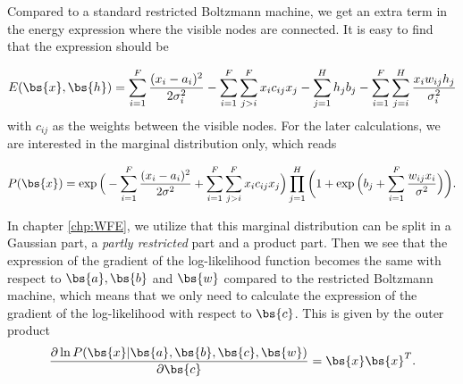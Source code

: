 Compared to a standard restricted Boltzmann machine, we get an extra term in the energy expression where the visible nodes are connected. It is easy to find that the expression should be

\begin{equation}
E(\bs{x},\bs{h})= \sum_{i=1}^F\frac{(x_i-a_i)^2}{2\sigma_i^2} - \sum_{i=1}^F\sum_{j>i}^Fx_ic_{ij}x_j- \sum_{j=1}^Hh_jb_j-\sum_{i=1}^F\sum_{j=i}^H \frac{x_iw_{ij}h_j}{\sigma_i^2} 
\label{eq:partlygaussianbinary}
\end{equation}
with $c_{ij}$ as the weights between the visible nodes. For the later calculations, we are interested in the marginal distribution only, which reads

\begin{equation}
P(\bs{x})=\exp\Big(-\sum_{i=1}^F\frac{(x_i-a_i)^2}{2\sigma^2}+\sum_{i=1}^F\sum_{j>i}^Fx_ic_{ij}x_j\Big)\prod_{j=1}^H\bigg(1+\exp\Big(b_j+\sum_{i=1}^F\frac{w_{ij}x_i}{\sigma^2}\Big)\bigg).
\label{eq:PRBMWF}
\end{equation}

In chapter \ref{chp:WFE}, we utilize that this marginal distribution can be split in a Gaussian part, a \textit{partly restricted} part and a product part. Then we see that the expression of the gradient of the log-likelihood function becomes the same with respect to $\bs{a},\bs{b}$ and $\bs{w}$ compared to the restricted Boltzmann machine, which means that we only need to calculate the expression of the gradient of the log-likelihood with respect to $\bs{c}$. This is given by the outer product
\begin{equation}
\frac{\partial\ln P(\bs{x}|\bs{a},\bs{b},\bs{c},\bs{w})}{\partial \bs{c}}=\bs{x}\bs{x}^T.
\end{equation}


